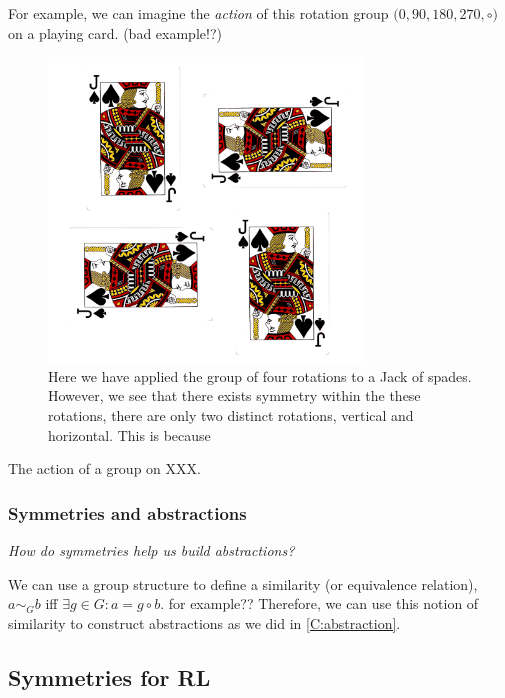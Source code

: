 For example, we can imagine the \textit{action} of this rotation group $\big(0, 90, 180, 270, \circ \big)$ on a playing card. (bad example!?)

\begin{figure}[h!]
	\centering
	\includegraphics[width=0.75\textwidth,height=0.5\textheight]{../../pictures/images/jacks.png}
	\caption{Here we have applied the group of four rotations to a Jack of spades.
	However, we see that there exists symmetry within the these rotations,
	there are only two distinct rotations, vertical and horizontal. This is because }
\end{figure}

The action of a group on XXX.

\subsubsection{Symmetries and abstractions}

\begin{displayquote}
\textsl{How do symmetries help us build abstractions?}
\end{displayquote}

We can use a group structure to define a similarity (or equivalence relation),
$a \sim_G b$ iff $\exists g \in G: a = g \circ b$. {\color{red} for example??} Therefore, we can use this
 notion of similarity to construct abstractions as we did in \ref{C:abstraction}.

\subsection{Symmetries for RL}\label{mdp-homomorphism}


